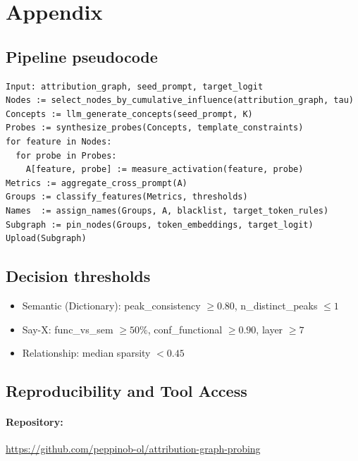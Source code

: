 
\appendix
\section{Appendix}
\label{sec:appendix}

\subsection{Pipeline pseudocode}
\begin{verbatim}
Input: attribution_graph, seed_prompt, target_logit
Nodes := select_nodes_by_cumulative_influence(attribution_graph, tau)
Concepts := llm_generate_concepts(seed_prompt, K)
Probes := synthesize_probes(Concepts, template_constraints)
for feature in Nodes:
  for probe in Probes:
    A[feature, probe] := measure_activation(feature, probe)
Metrics := aggregate_cross_prompt(A)
Groups := classify_features(Metrics, thresholds)
Names  := assign_names(Groups, A, blacklist, target_token_rules)
Subgraph := pin_nodes(Groups, token_embeddings, target_logit)
Upload(Subgraph)
\end{verbatim}

\subsection{Decision thresholds}
\begin{itemize}
  \item Semantic (Dictionary): peak\_consistency $\ge 0.80$, n\_distinct\_peaks $\le 1$
  \item Say-X: func\_vs\_sem $\ge 50\%$, conf\_functional $\ge 0.90$, layer $\ge 7$
  \item Relationship: median sparsity $< 0.45$
\end{itemize}

\subsection{Reproducibility and Tool Access}
\label{sec:repro}

\paragraph{Repository:} \url{https://github.com/peppinob-ol/attribution-graph-probing}  

